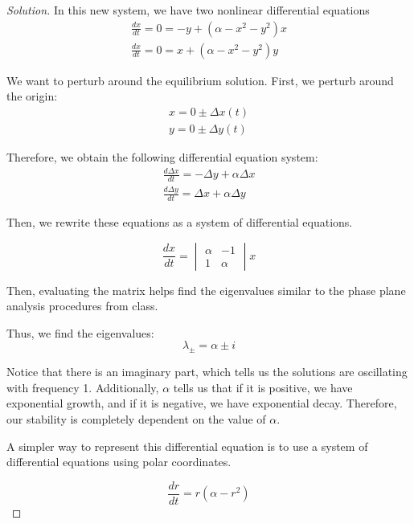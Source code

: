 \documentclass{article}
\theoremstyle{definition}
\theoremstyle{remark}
\begin{document}
\begin{proof}[Solution]\renewcommand{\qedsymbol}{}
In this new system, we have two nonlinear differential equations  
\begin{align}\label{equilibria 2.5}
    \frac{dx}{dt} = 0 = 
   -y + (\alpha - x^2 -y^2)x \nonumber 
    \\
    \frac{dx}{dt} = 0 = 
    x+ (\alpha - x^2 -y^2)y \nonumber
\end{align}


We want to perturb around the equilibrium solution. First, we perturb around the origin:
\begin{align}
    x = \boxed{0 \pm \Delta x(t)}
    \\
    y = \boxed{0 \pm \Delta y(t)} 
\end{align}

Therefore, we obtain the following differential equation system: 
\begin{align}
    \frac{d\Delta x}{dt} = -\Delta y + \alpha \Delta x
    \\
    \frac{d\Delta y}{dt} = \Delta x + \alpha \Delta y
\end{align}

Then, we rewrite these equations as a system of differential equations. 

\[\frac{dx}{dt} = 
\begin{vmatrix}
\alpha & -1\\
1 & \alpha
\end{vmatrix} x\]

Then, evaluating the matrix helps find the eigenvalues similar to the phase plane analysis procedures from class. 

Thus, we find the eigenvalues:
\begin{equation}
    \lambda_\pm = \alpha \pm i
\end{equation}

Notice that there is an imaginary part, which tells us the solutions are oscillating with frequency 1. Additionally, $\alpha$ tells us that if it is positive, we have exponential growth, and if it is negative, we have exponential decay. Therefore, our stability is completely dependent on the value of $\alpha$.

A simpler way to represent this differential equation is to use a system of differential equations using polar coordinates.

\begin{equation}
    \frac{dr}{dt} = r(\alpha-r^2)
\end{equation}


\end{proof}
\end{document}
